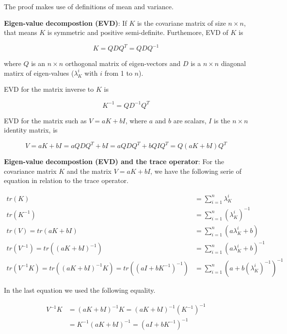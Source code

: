 \documentclass[]{book}
\begin{document}
The proof makes use of definitions of mean and variance.

\textbf{Eigen-value decompostion (EVD)}: If \(K\) is the covariane
matrix of size \(n \times n\), that means \(K\) is symmetric and
positive semi-definite. Furthemore, EVD of \(K\) is

\begin{equation}
K = Q D Q^T = Q D Q^{-1}
\label{eq:evdk}
\end{equation}

where \(Q\) is an \(n \times n\) orthogonal matrix of eigen-vectors and
\(D\) is a \(n \times n\) diagonal matirx of eigen-values
(\(\lambda_{K}^i\) with \(i\) from 1 to \(n\)).

EVD for the matrix inverse to \(K\) is

\begin{equation}
K^{-1} = Q D^{-1} Q^T
\label{eq:evdkinv}
\end{equation}

EVD for the matrix such as \(V = a K + b I\), where \(a\) and \(b\) are
scalars, \(I\) is the \(n \times n\) identity matrix, is

\begin{equation}
V = a K + b I = a Q D Q^T + b I = a Q D Q^T + b Q I Q^T = Q (a K + b I) Q^T
\label{eq:evdkinv}
\end{equation}

\textbf{Eigen-value decompostion (EVD) and the trace operator}: For the
covariance matrix \(K\) and the matrix \(V = a K + b I\), we have the
following serie of equation in relation to the trace operator.

\begin{equation}
\begin{split}
tr(K) & = \sum_{i=1}^{n}{\lambda_{K}^i} \\
tr(K^{-1}) & = \sum_{i=1}^{n}{(\lambda_{K}^i)^{-1}} \\
tr(V) = tr(a K + b I) & = \sum_{i=1}^{n}{(a \lambda_{K}^i + b)} \\
tr(V^{-1}) = tr((a K + b I)^{-1}) & = \sum_{i=1}^{n}{(a \lambda_{K}^i + b)^{-1}} \\
tr(V^{-1} K) = tr((a K + b I)^{-1} K) = tr((a I + b K^{-1})^{-1}) & = \sum_{i=1}^{n}{(a + b (\lambda_{K}^i)^{-1})^{-1}}
\end{split}
\label{eq:evdtr}
\end{equation}

In the last equation we used the following equality.

\begin{equation}
\begin{split}
V^{-1} K & = (a K + b I)^{-1} K = (a K + b I)^{-1} (K^{-1})^{-1} \\
 & = K^{-1} (a K + b I)^{-1} = (a I + b K^{-1})^{-1}
\end{split}
\label{eq:vinv}
\end{equation}
\end{document}
